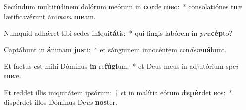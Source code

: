 \item Secúndum multitúdinem dolórum meórum in \textbf{cor}de \textbf{me}o:~* consolatiónes tuæ lætificavérunt áni\textit{mam} \textbf{me}am.
\item Numquid adhǽret tibi sedes in\textbf{i}qui\textbf{tá}tis:~* qui fingis labórem in \textit{præ}\textbf{cép}to?
\item Captábunt in \textbf{á}nimam \textbf{jus}ti:~* et sánguinem innocéntem con\textit{dem}\textbf{ná}bunt.
\item Et factus est mihi Dóminus \textbf{in} re\textbf{fú}\textbf{gi}um:~* et Deus meus in adjutórium spe\textit{i} \textbf{me}æ.
\item Et reddet illis iniquitátem ipsórum:~† et in malítia eórum dis\textbf{pér}det \textbf{e}os:~* dispérdet illos Dóminus De\textit{us} \textbf{nos}ter.
